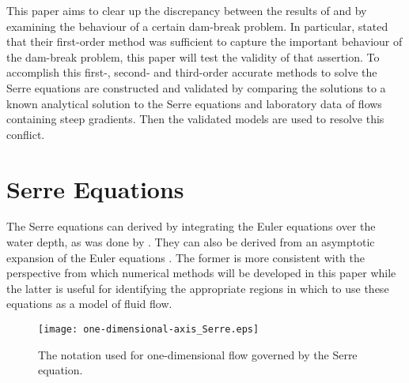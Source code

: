 \documentclass[SingleSpace,12pt,Proceedings]{Serre_ASCE}
\begin{document}
This paper aims to clear up the discrepancy between the results of  and  by examining the behaviour of a certain dam-break problem. In particular,  stated that their first-order method was sufficient to capture the important behaviour of the dam-break problem, this paper will test the validity of that assertion. To accomplish this first-, second- and third-order accurate methods to solve the Serre equations are constructed and validated by comparing the solutions to a known analytical solution to the Serre equations and laboratory data of flows containing steep gradients. Then the validated models are used to resolve this conflict. 

\section{Serre Equations}
\label{section:Serre Equations}
The Serre equations can derived by integrating the Euler equations over the water depth, as was done by . They can also be derived from an asymptotic expansion of the Euler equations \cite{Bonneton-Lannes-2009-16601}. The former is more consistent with the perspective from which numerical methods will be developed in this paper while the latter is useful for identifying the appropriate regions in which to use these equations as a model of fluid flow.
\begin{figure}
\begin{center}
\texttt{[image: one-dimensional-axis\_Serre.eps]}
\end{center}
\caption{The notation used for one-dimensional flow governed by the Serre equation.}
\label{fig:Notation}
\end{figure}
\end{document}
